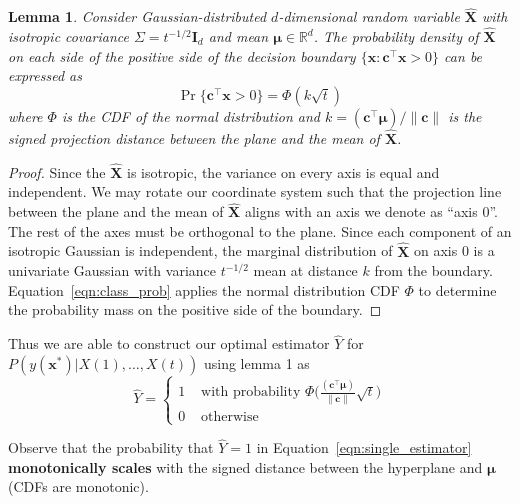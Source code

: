 \documentclass[12pt]{article}
\newtheorem{lemma}{Lemma}
\begin{document}
\begin{lemma}
	\label{lemma:zscore}
	Consider Gaussian-distributed $d$-dimensional random variable $\hat{\mathbf X}$ with isotropic covariance $\Sigma = t^{-1/2}\mathbf I_d$ and mean $\mathbf \mu \in \mathbb R^d$.
	The probability density of $\hat{\mathbf X}$ on each side of the positive side of the decision boundary $\{\mathbf x : \mathbf c^\top \mathbf x > 0\}$ can be expressed as 
	\begin{equation}
		\label{eqn:class_prob}
		\Pr\{\mathbf c^\top \mathbf x > 0\} = \Phi(k\sqrt{t})
	\end{equation}
	where $\Phi$ is the CDF of the normal distribution and $k = \mathbf{(c^\top \mu)/ \|\mathbf c\|}$ is the signed projection distance between the plane and the mean of $\hat{\mathbf X}$. 
\end{lemma}
\begin{proof}
	Since the $\hat{\mathbf X}$ is isotropic, the variance on every axis is equal and independent. 
	We may rotate our coordinate system such that the projection line between the plane and the mean of $\hat{\mathbf X}$ aligns with an axis we denote as ``axis 0''. 
	The rest of the axes must be orthogonal to the plane. 
	Since each component of an isotropic Gaussian is independent, the marginal distribution of $\hat{\mathbf X}$ on axis 0 is a univariate Gaussian with variance $t^{-1/2}$ mean at distance $k$ from the boundary. 
	Equation~\ref{eqn:class_prob} applies the normal distribution CDF $\Phi$ to determine the probability mass on the positive side of the boundary. 
\end{proof}


Thus we are able to construct our optimal estimator $\hat{Y}$ for $P(y(\mathbf x^*) | X(1), \dots, X(t))$ using lemma 1 as 
\begin{equation}
	\label{eqn:single_estimator}
	\hat{Y} = \begin{cases}
		1 & \text{ with probability } \Phi\big( 
			\frac{
				\mathbf{(c^\top \mu)}
			}{
				\|\mathbf c\|
			}
			\sqrt t
			\big)\\ 
		0 & \text{ otherwise } 
	\end{cases}
\end{equation}


Observe that the probability that $\hat Y = 1$ in Equation~\ref{eqn:single_estimator} \textbf{monotonically scales} with the signed distance between the hyperplane and $\mathbf \mu$ (CDFs are monotonic). 
\end{document}
